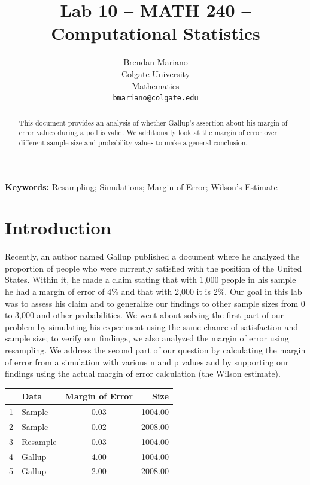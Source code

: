 \documentclass{article}\usepackage[]{graphicx}\usepackage[]{xcolor}
\newenvironment{Figure}
  {\par\medskip\noindent\minipage{\linewidth}}
  {\endminipage\par\medskip}
\begin{document}
\vspace{-1in}
\title{Lab 10 -- MATH 240 -- Computational Statistics}

\author{
  Brendan Mariano \\
  Colgate University  \\
  Mathematics  \\
  {\tt bmariano@colgate.edu}
}

\date{}

\maketitle

\begin{multicols}{2}
\begin{abstract}
This document provides an analysis of whether Gallup's assertion about his margin of error values during a poll is valid. We additionally look at the margin of error over different sample size and probability values to make a general conclusion.
\end{abstract}

\noindent \textbf{Keywords:} Resampling; Simulations; Margin of Error; Wilson's Estimate

\section{Introduction}
Recently, an author named Gallup published a document where he analyzed the proportion of people who were currently satisfied with the position of the United States. Within it, he made a claim stating that with 1,000 people in his sample he had a margin of error of 4\% and that with 2,000 it is 2\%. Our goal in this lab was to assess his claim and to generalize our findings to other sample sizes from 0 to 3,000 and other probabilities. We went about solving the first part of our problem by simulating his experiment using the same chance of satisfaction and sample size; to verify our findings, we also analyzed the margin of error using resampling. We  address the second part of our question by calculating the margin of error from a simulation with various n and p values and by supporting our findings using the actual margin of error calculation (the Wilson estimate). 


\begin{Figure}
\centering
\begin{tabular}{rlcr}
  \hline
 & Data & Margin of Error & Size \\ 
  \hline
1 & Sample & 0.03 & 1004.00 \\ 
  2 & Sample & 0.02 & 2008.00 \\ 
  3 & Resample & 0.03 & 1004.00 \\ 
  4 & Gallup & 4.00 & 1004.00 \\ 
  5 & Gallup & 2.00 & 2008.00 \\ 
   \hline
\end{tabular}
\end{Figure}


\end{multicols}
\end{document}
